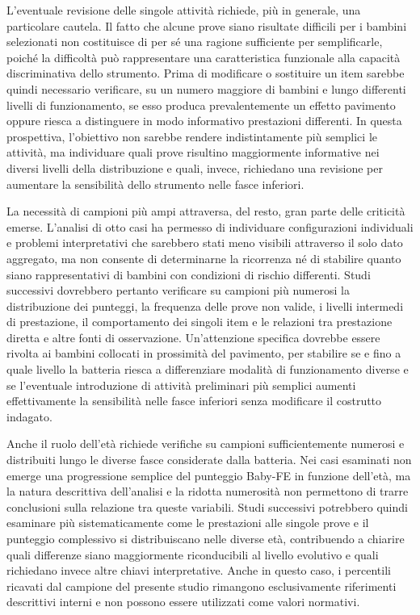L'eventuale revisione delle singole attività richiede, più in generale, una particolare cautela. Il fatto che alcune prove siano risultate difficili per i bambini selezionati non costituisce di per sé una ragione sufficiente per semplificarle, poiché la difficoltà può rappresentare una caratteristica funzionale alla capacità discriminativa dello strumento. Prima di modificare o sostituire un item sarebbe quindi necessario verificare, su un numero maggiore di bambini e lungo differenti livelli di funzionamento, se esso produca prevalentemente un effetto pavimento oppure riesca a distinguere in modo informativo prestazioni differenti. In questa prospettiva, l'obiettivo non sarebbe rendere indistintamente più semplici le attività, ma individuare quali prove risultino maggiormente informative nei diversi livelli della distribuzione e quali, invece, richiedano una revisione per aumentare la sensibilità dello strumento nelle fasce inferiori.

La necessità di campioni più ampi attraversa, del resto, gran parte delle criticità emerse. L'analisi di otto casi ha permesso di individuare configurazioni individuali e problemi interpretativi che sarebbero stati meno visibili attraverso il solo dato aggregato, ma non consente di determinarne la ricorrenza né di stabilire quanto siano rappresentativi di bambini con condizioni di rischio differenti. Studi successivi dovrebbero pertanto verificare su campioni più numerosi la distribuzione dei punteggi, la frequenza delle prove non valide, i livelli intermedi di prestazione, il comportamento dei singoli item e le relazioni tra prestazione diretta e altre fonti di osservazione. Un'attenzione specifica dovrebbe essere rivolta ai bambini collocati in prossimità del pavimento, per stabilire se e fino a quale livello la batteria riesca a differenziare modalità di funzionamento diverse e se l'eventuale introduzione di attività preliminari più semplici aumenti effettivamente la sensibilità nelle fasce inferiori senza modificare il costrutto indagato.

Anche il ruolo dell'età richiede verifiche su campioni sufficientemente numerosi e distribuiti lungo le diverse fasce considerate dalla batteria. Nei casi esaminati non emerge una progressione semplice del punteggio Baby-FE in funzione dell'età, ma la natura descrittiva dell'analisi e la ridotta numerosità non permettono di trarre conclusioni sulla relazione tra queste variabili. Studi successivi potrebbero quindi esaminare più sistematicamente come le prestazioni alle singole prove e il punteggio complessivo si distribuiscano nelle diverse età, contribuendo a chiarire quali differenze siano maggiormente riconducibili al livello evolutivo e quali richiedano invece altre chiavi interpretative. Anche in questo caso, i percentili ricavati dal campione del presente studio rimangono esclusivamente riferimenti descrittivi interni e non possono essere utilizzati come valori normativi.

